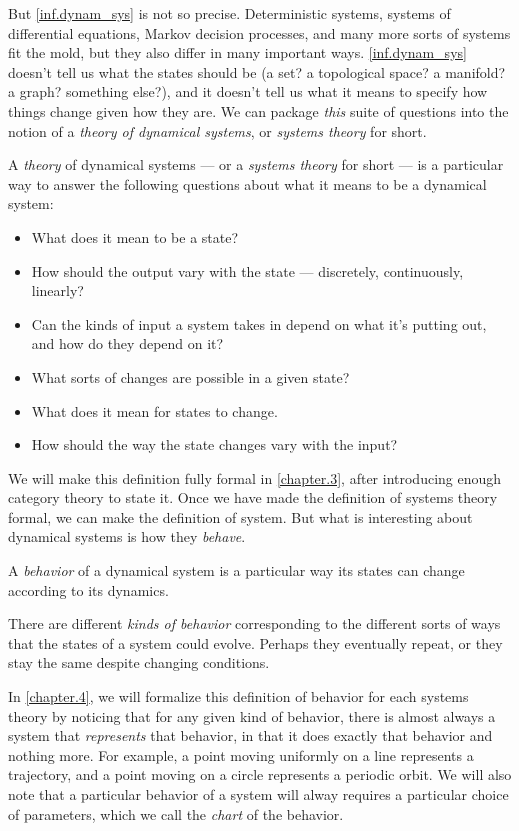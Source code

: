 \documentclass[DynamicalBook]{subfiles}
\begin{document}
But \cref{inf.dynam_sys} is not so precise. Deterministic systems, systems of differential equations, Markov decision processes, and many more sorts of systems fit the mold, but they also differ in many important ways. \cref{inf.dynam_sys} doesn't tell us what the states should be (a set? a topological space? a manifold? a graph? something else?), and it doesn't tell us what it means to specify how things change given how they are. We can package \emph{this} suite of questions into the notion of a \emph{theory of dynamical systems}, or \emph{systems theory} for short.

\begin{informal}\label{informal.doctrine}
  A \emph{theory} of dynamical systems --- or a \emph{systems theory} for short --- is a particular way to answer the following
  questions about what it means to be a dynamical system:
  \begin{itemize}
  \item What does it mean to be a state?
  \item How should the output vary with the state --- discretely,
    continuously, linearly?
  \item Can the kinds of input a
    system takes in depend on what it's putting out, and how do they depend on it?
  \item What sorts of changes are possible in a given state?
  \item What does it mean for states to change.
  \item How should the way the state changes vary with the input?
  \end{itemize}
\end{informal}

We will make this definition fully formal in \cref{chapter.3}, after introducing enough category theory to state it. Once we have made the definition of systems theory formal, we can make the definition of system. But what is interesting about dynamical systems is how they \emph{behave}.
\begin{informal}\label{inf:behavior}
  A \emph{behavior} of a dynamical system is a particular way its states can
  change according to its dynamics.

  There are different \emph{kinds of behavior} corresponding to the different
  sorts of ways that the states of a system could evolve. Perhaps they eventually
  repeat, or they stay the same despite changing conditions.
\end{informal}

In \cref{chapter.4}, we will formalize this definition of behavior for each systems theory by noticing that for any given kind of behavior, there is almost always a system that \emph{represents} that behavior, in that it does exactly that behavior and nothing more. For example, a point moving uniformly on a line represents a trajectory, and a point moving on a circle represents a periodic orbit. We will also note that a particular behavior of a system will alway requires a particular choice of parameters, which we call the \emph{chart} of the behavior.
\end{document}
